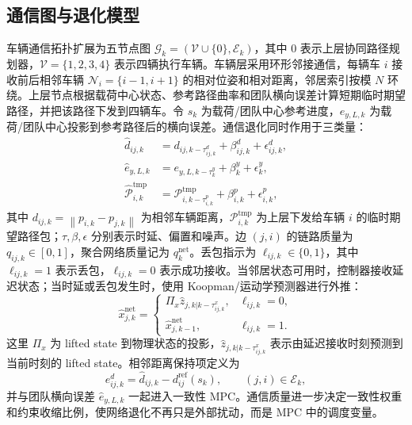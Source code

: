 \documentclass[twocolumn,3p,times,procedia]{elsarticle}
\newcommand{\norm}[1]{\left\lVert #1 \right\rVert}
\begin{document}
\subsection{通信图与退化模型}

车辆通信拓扑扩展为五节点图 $\mathcal G_k=(\mathcal V\cup\{0\},\mathcal E_k)$，其中 $0$ 表示上层协同路径规划器，$\mathcal V=\{1,2,3,4\}$ 表示四辆执行车辆。车辆层采用环形邻接通信，每辆车 $i$ 接收前后相邻车辆 $\mathcal N_i=\{i-1,i+1\}$ 的相对位姿和相对距离，邻居索引按模 $N$ 环绕。上层节点根据载荷中心状态、参考路径曲率和团队横向误差计算短期临时期望路径，并把该路径下发到四辆车。令 $s_k$ 为载荷/团队中心参考进度，$e_{y,L,k}$ 为载荷/团队中心投影到参考路径后的横向误差。通信退化同时作用于三类量：
\begin{equation}
\begin{aligned}
\hat d_{ij,k}&=d_{ij,k-\tau^d_{ij,k}}+\beta^d_{ij,k}+\epsilon^d_{ij,k},\\
\hat e_{y,L,k}&=e_{y,L,k-\tau^y_k}+\beta^y_k+\epsilon^y_k,\\
\hat{\mathcal P}_{i,k}^{\mathrm{tmp}}&=\mathcal P_{i,k-\tau^p_{i,k}}^{\mathrm{tmp}}+\beta^p_{i,k}+\epsilon^p_{i,k},
\end{aligned}
\label{eq:comm_corrupted_measurements}
\end{equation}
其中 $d_{ij,k}=\norm{p_{i,k}-p_{j,k}}$ 为相邻车辆距离，$\mathcal P_{i,k}^{\mathrm{tmp}}$ 为上层下发给车辆 $i$ 的临时期望路径包；$\tau,\beta,\epsilon$ 分别表示时延、偏置和噪声。边 $(j,i)$ 的链路质量为 $q_{ij,k}\in[0,1]$，聚合网络质量记为 $q_k^{\mathrm{net}}$。丢包指示为 $\ell_{ij,k}\in\{0,1\}$，其中 $\ell_{ij,k}=1$ 表示丢包，$\ell_{ij,k}=0$ 表示成功接收。当邻居状态可用时，控制器接收延迟状态；当时延或丢包发生时，使用 Koopman/运动学预测器进行外推：
\begin{equation}
\hat x_{j,k}^{\mathrm{net}}=
\begin{cases}
\Pi_x \hat z_{j,k|k-\tau^x_{ij,k}}, & \ell_{ij,k}=0,\\
\hat x_{j,k-1}^{\mathrm{net}}, & \ell_{ij,k}=1 .
\end{cases}
\label{eq:delay_prediction}
\end{equation}
这里 $\Pi_x$ 为 lifted state 到物理状态的投影，$\hat z_{j,k|k-\tau^x_{ij,k}}$ 表示由延迟接收时刻预测到当前时刻的 lifted state。相邻距离保持项定义为
\begin{equation}
e^{d}_{ij,k}=\hat d_{ij,k}-d^{\mathrm{ref}}_{ij}(s_k),\qquad (j,i)\in\mathcal E_k ,
\label{eq:adjacent_distance_error}
\end{equation}
并与团队横向误差 $\hat e_{y,L,k}$ 一起进入一致性 MPC。通信质量进一步决定一致性权重和约束收缩比例，使网络退化不再只是外部扰动，而是 MPC 中的调度变量。
\end{document}
